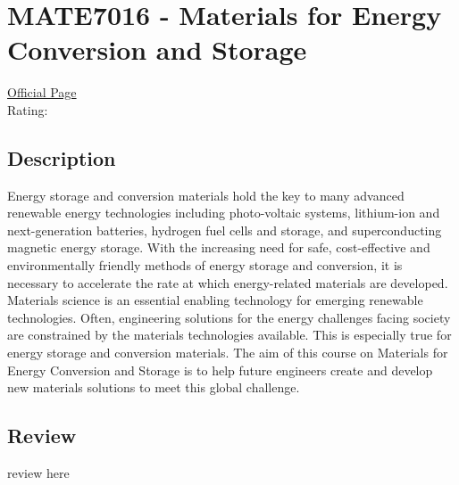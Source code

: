 \hypertarget{MATE7016}{\section{MATE7016 - Materials for Energy Conversion and Storage}}

\large
\textcolor{turbo_purple}{\href{https://my.uq.edu.au/programs-courses/course.html?course_code=MATE7016}{Official Page}} \\
Rating: \cstar\cstar\cstar\cstar\ostar

\normalsize
\subsection*{Description}
Energy storage and conversion materials hold the key to many advanced renewable energy technologies including photo-voltaic systems, lithium-ion and next-generation batteries, hydrogen fuel cells and storage, and superconducting magnetic energy storage.
With the increasing need for safe, cost-effective and environmentally friendly methods of energy storage and conversion, it is necessary to accelerate the rate at which energy-related materials are developed.
Materials science is an essential enabling technology for emerging renewable technologies.
Often, engineering solutions for the energy challenges facing society are constrained by the materials technologies available.
This is especially true for energy storage and conversion materials.
The aim of this course on Materials for Energy Conversion and Storage is to help future engineers create and develop new materials solutions to meet this global challenge.

\subsection*{Review}
review here
